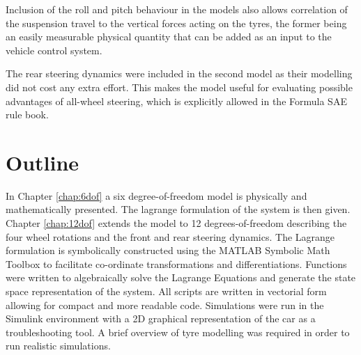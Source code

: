 Inclusion of the roll and pitch behaviour in the models also allows correlation of the suspension travel to the vertical forces acting on the tyres, the former being an easily measurable physical quantity that can be added as an input to the vehicle control system.

The rear steering dynamics were included in the second model as their modelling did not cost any extra effort. This makes the model useful for evaluating possible advantages of all-wheel steering, which is explicitly allowed in the Formula SAE rule book.

\section{Outline}
\label{sec:approach}
In Chapter \ref{chap:6dof} a six degree-of-freedom model is physically and mathematically presented. The lagrange formulation of the system is then given. Chapter \ref{chap:12dof} extends the model to 12 degrees-of-freedom describing the four wheel rotations and the front and rear steering dynamics.
The Lagrange formulation is symbolically constructed using the MATLAB Symbolic Math Toolbox to facilitate co-ordinate transformations and differentiations.
Functions were written to algebraically solve the Lagrange Equations and generate the state space representation of the system.
All scripts are written in vectorial form allowing for compact and more readable code.
Simulations were run in the Simulink environment with a 2D graphical representation of the car as a troubleshooting tool.
A brief overview of tyre modelling was required in order to run realistic simulations.
